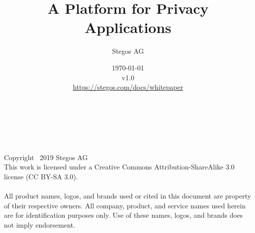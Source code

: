 \documentclass[8pt,fleqn,openany]{book}
\title{A Platform for Privacy Applications}
\author{Stegos AG}
\date{\today \\v1.0\\ \vspace{10pt}\colorlet{urllinkcolor}{white}\url{https://stegos.com/docs/whitepaper}}
\makeatletter
\renewcommand{\maketitle}{\bgroup\setlength{\parindent}{0pt}
\begin{flushleft}
	\vspace*{260pt}
	{\fontsize{42}{42}\selectfont
	\textbf{\sffamily\color{white}\@title\\}}

	\vspace*{100pt}

	{\sffamily\color{white}\fontsize{14}{18}\selectfont
	\@author\\
	\@date}
\end{flushleft}\egroup
}
\makeatother
\begin{document}
\begin{CJK*}{UTF8}{gbsn}

\raggedbottom
{}

\thispagestyle{fancy}

\begingroup
\thispagestyle{empty}
\maketitle
\endgroup

\nobreakspace

\vfill{\footnotesize\noindent{}Copyright \textcopyright\ 2019 Stegos AG\\
This work is licensed under a Creative Commons Attribution-ShareAlike 3.0
license (CC BY-SA 3.0).\\\\
All product names, logos, and brands used or cited in this document are
property of their respective owners. All company, product, and service names
used herein are for identification purposes only. Use of these names, logos,
and brands does not imply endorsement.}


\end{CJK*}
\end{document}
